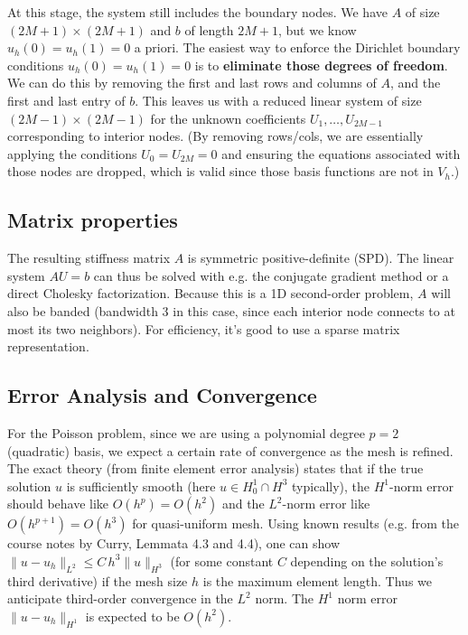 \documentclass[a4paper,10pt]{article}
\begin{document}
At this stage, the system still includes the boundary nodes. We have \(A\) of size \((2M+1)\times(2M+1)\) and \(b\) of length \(2M+1\), but we know \(u_h(0)=u_h(1)=0\) a priori. 
The easiest way to enforce the Dirichlet boundary conditions \(u_h(0)=u_h(1)=0\) is to \textbf{eliminate those degrees of freedom}. 
We can do this by removing the first and last rows and columns of \(A\), and the first and last entry of \(b\).
This leaves us with a reduced linear system of size \((2M-1)\times(2M-1)\) for the unknown coefficients \(U_1,\dots,U_{2M-1}\) corresponding to interior nodes. (By removing rows/cols, we are essentially applying the conditions \(U_0=U_{2M}=0\) and ensuring the equations associated with those nodes are dropped, which is valid since those basis functions are not in \(V_h\).)

\subsection*{Matrix properties}
The resulting stiffness matrix \(A\) is symmetric positive-definite (SPD). 
The linear system \(A U = b\) can thus be solved with e.g. the conjugate gradient method or a direct Cholesky factorization. 
Because this is a 1D second-order problem, \(A\) will also be banded (bandwidth 3 in this case, since each interior node connects to at most its two neighbors). 
For efficiency, it's good to use a sparse matrix representation.

\subsection{Error Analysis and Convergence}
For the Poisson problem, since we are using a polynomial degree \(p=2\) (quadratic) basis, we expect a certain rate of convergence as the mesh is refined.
The exact theory (from finite element error analysis) states that if the true solution \(u\) is sufficiently smooth (here \(u\in H^1_0\cap H^3\) typically), the \(H^1\)-norm error should behave like \(O(h^p) = O(h^2)\) and the \(L^2\)-norm error like \(O(h^{p+1}) = O(h^3)\) for quasi-uniform mesh.
Using known results (e.g. from the course notes by Curry, Lemmata 4.3 and 4.4), one can show \(\|u - u_h\|_{L^2} \le C\,h^3 \|u\|_{H^3}\) (for some constant \(C\) depending on the solution's third derivative) if the mesh size \(h\) is the maximum element length. Thus we anticipate third-order convergence in the \(L^2\) norm. The \(H^1\) norm error \(\|u-u_h\|_{H^1}\) is expected to be \(O(h^2)\).
\end{document}
